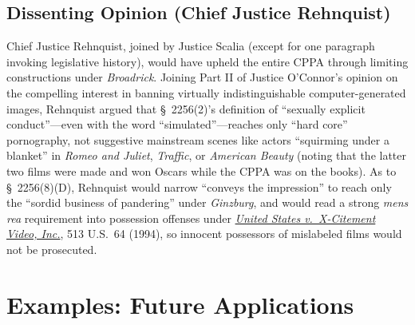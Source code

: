 \documentclass[12pt]{article}
\begin{document}
\subsection{Dissenting Opinion (Chief Justice Rehnquist)}

Chief Justice Rehnquist, joined by Justice Scalia (except for one paragraph invoking legislative history), would have upheld the entire CPPA through limiting constructions under \textit{Broadrick}. Joining Part II of Justice O'Connor's opinion on the compelling interest in banning virtually indistinguishable computer-generated images, Rehnquist argued that \S~2256(2)'s definition of ``sexually explicit conduct''---even with the word ``simulated''---reaches only ``hard core'' pornography, not suggestive mainstream scenes like actors ``squirming under a blanket'' in \textit{Romeo and Juliet}, \textit{Traffic}, or \textit{American Beauty} (noting that the latter two films were made and won Oscars while the CPPA was on the books). As to \S~2256(8)(D), Rehnquist would narrow ``conveys the impression'' to reach only the ``sordid business of pandering'' under \textit{Ginzburg}, and would read a strong \textit{mens rea} requirement into possession offenses under \href{https://supreme.justia.com/cases/federal/us/513/64/case.pdf}{\textit{United States v.\ X-Citement Video, Inc.}}, 513 U.S.\ 64 (1994), so innocent possessors of mislabeled films would not be prosecuted.

\section{Examples: Future Applications}
\end{document}
